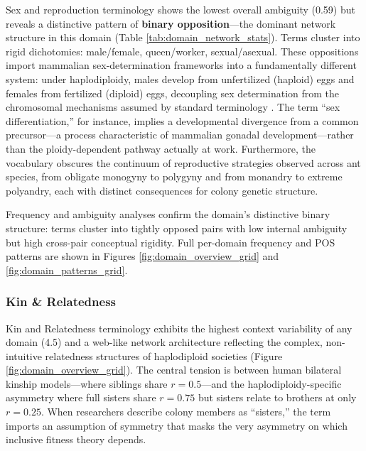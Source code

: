 \documentclass[
]{article}
\numberwithin{equation}{section}
\begin{document}
Sex and reproduction terminology shows the lowest overall ambiguity
(0.59) but reveals a distinctive pattern of \textbf{binary
opposition}---the dominant network structure in this domain (Table
\ref{tab:domain_network_stats}). Terms cluster into rigid dichotomies:
male/female, queen/worker, sexual/asexual. These oppositions import
mammalian sex-determination frameworks into a fundamentally different
system: under haplodiploidy, males develop from unfertilized (haploid)
eggs and females from fertilized (diploid) eggs, decoupling sex
determination from the chromosomal mechanisms assumed by standard
terminology \cite{chandra2021epigenetics}. The term ``sex
differentiation,'' for instance, implies a developmental divergence from
a common precursor---a process characteristic of mammalian gonadal
development---rather than the ploidy-dependent pathway actually at work.
Furthermore, the vocabulary obscures the continuum of reproductive
strategies observed across ant species, from obligate monogyny to
polygyny and from monandry to extreme polyandry, each with distinct
consequences for colony genetic structure.

Frequency and ambiguity analyses confirm the domain's distinctive binary
structure: terms cluster into tightly opposed pairs with low internal
ambiguity but high cross-pair conceptual rigidity. Full per-domain
frequency and POS patterns are shown in Figures
\ref{fig:domain_overview_grid} and \ref{fig:domain_patterns_grid}.

\subsubsection{Kin \& Relatedness}\label{kin-relatedness}

Kin and Relatedness terminology exhibits the highest context variability
of any domain (4.5) and a web-like network architecture reflecting the
complex, non-intuitive relatedness structures of haplodiploid societies
(Figure \ref{fig:domain_overview_grid}). The central tension is between
human bilateral kinship models---where siblings share \(r = 0.5\)---and
the haplodiploidy-specific asymmetry where full sisters share
\(r = 0.75\) but sisters relate to brothers at only \(r = 0.25\). When
researchers describe colony members as ``sisters,'' the term imports an
assumption of symmetry that masks the very asymmetry on which inclusive
fitness theory depends.
\end{document}

